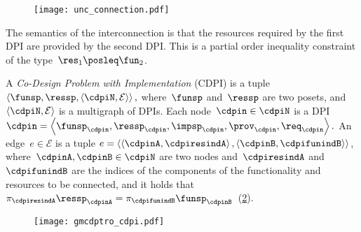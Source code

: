 \begin{figure}[h]
  \centering
  \texttt{[image: unc\_connection.pdf]}
  \caption{\label{fig:connection}}
\end{figure}


\noindent The semantics of the interconnection is that the resources
required by the first DPI are provided by the second DPI. This is
a partial order inequality constraint of the type~$\res_{1}\posleq\fun_{2}$.

\begin{definition}
  \label{def:cdpi}A \emph{Co-Design Problem with Implementation} (CDPI)
  is a tuple $\left\langle \funsp,\ressp,\left\langle \cdpiN,\mathcal{E}\right\rangle \right\rangle ,$
  where~$\funsp$ and~$\ressp$ are two posets, and~$\left\langle \cdpiN,\mathcal{E}\right\rangle $
  is a\emph{ }multigraph of DPIs. Each node~$\cdpin\in\cdpiN$ is a
  DPI $\cdpin=\left\langle \funsp_{\cdpin},\ressp_{\cdpin},\impsp_{\cdpin},\prov_{\cdpin},\req_{\cdpin}\right\rangle .$
  An edge~$e\in\mathcal{E}$ is a tuple $e=\left\langle \left\langle \cdpinA,\cdpiresindA\right\rangle ,\left\langle \cdpinB,\cdpifunindB\right\rangle \right\rangle $,
  where~$\cdpinA,\cdpinB\in\cdpiN$ are two nodes and~$\cdpiresindA$
  and~$\cdpifunindB$ are the indices of the components of the functionality
  and resources to be connected, and it holds that~$\pi_{\cdpiresindA}\ressp_{\cdpinA}=\pi_{\cdpifunindB}\funsp_{\cdpinB}$~(\cref{fig:mcdps}).

  \begin{figure}[h]
    \centering
    \texttt{[image: gmcdptro\_cdpi.pdf]}
    \caption{\label{fig:mcdps}}
  \end{figure}


\end{definition}

